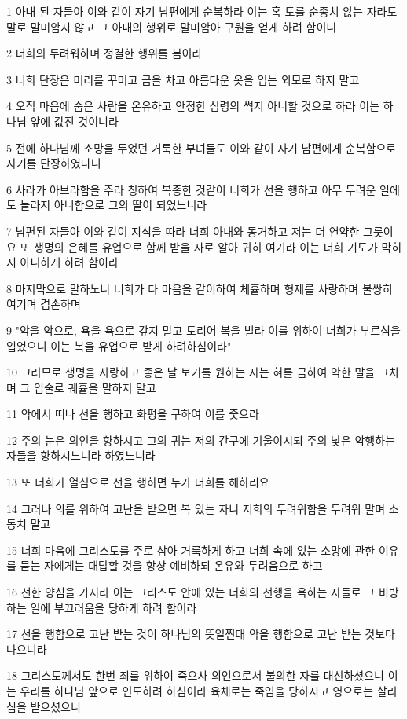 \par 1 아내 된 자들아 이와 같이 자기 남편에게 순복하라 이는 혹 도를 순종치 않는 자라도 말로 말미암지 않고 그 아내의 행위로 말미암아 구원을 얻게 하려 함이니
\par 2 너희의 두려워하며 정결한 행위를 봄이라
\par 3 너희 단장은 머리를 꾸미고 금을 차고 아름다운 옷을 입는 외모로 하지 말고
\par 4 오직 마음에 숨은 사람을 온유하고 안정한 심령의 썩지 아니할 것으로 하라 이는 하나님 앞에 값진 것이니라
\par 5 전에 하나님께 소망을 두었던 거룩한 부녀들도 이와 같이 자기 남편에게 순복함으로 자기를 단장하였나니
\par 6 사라가 아브라함을 주라 칭하여 복종한 것같이 너희가 선을 행하고 아무 두려운 일에도 놀라지 아니함으로 그의 딸이 되었느니라
\par 7 남편된 자들아 이와 같이 지식을 따라 너희 아내와 동거하고 저는 더 연약한 그릇이요 또 생명의 은혜를 유업으로 함께 받을 자로 알아 귀히 여기라 이는 너희 기도가 막히지 아니하게 하려 함이라
\par 8 마지막으로 말하노니 너희가 다 마음을 같이하여 체휼하며 형제를 사랑하며 불쌍히 여기며 겸손하며
\par 9 "악을 악으로, 욕을 욕으로 갚지 말고 도리어 복을 빌라 이를 위하여 너희가 부르심을 입었으니 이는 복을 유업으로 받게 하려하심이라"
\par 10 그러므로 생명을 사랑하고 좋은 날 보기를 원하는 자는 혀를 금하여 악한 말을 그치며 그 입술로 궤휼을 말하지 말고
\par 11 악에서 떠나 선을 행하고 화평을 구하여 이를 좇으라
\par 12 주의 눈은 의인을 향하시고 그의 귀는 저의 간구에 기울이시되 주의 낯은 악행하는 자들을 향하시느니라 하였느니라
\par 13 또 너희가 열심으로 선을 행하면 누가 너희를 해하리요
\par 14 그러나 의를 위하여 고난을 받으면 복 있는 자니 저희의 두려워함을 두려워 말며 소동치 말고
\par 15 너희 마음에 그리스도를 주로 삼아 거룩하게 하고 너희 속에 있는 소망에 관한 이유를 묻는 자에게는 대답할 것을 항상 예비하되 온유와 두려움으로 하고
\par 16 선한 양심을 가지라 이는 그리스도 안에 있는 너희의 선행을 욕하는 자들로 그 비방하는 일에 부끄러움을 당하게 하려 함이라
\par 17 선을 행함으로 고난 받는 것이 하나님의 뜻일찐대 악을 행함으로 고난 받는 것보다 나으니라
\par 18 그리스도께서도 한번 죄를 위하여 죽으사 의인으로서 불의한 자를 대신하셨으니 이는 우리를 하나님 앞으로 인도하려 하심이라 육체로는 죽임을 당하시고 영으로는 살리심을 받으셨으니
